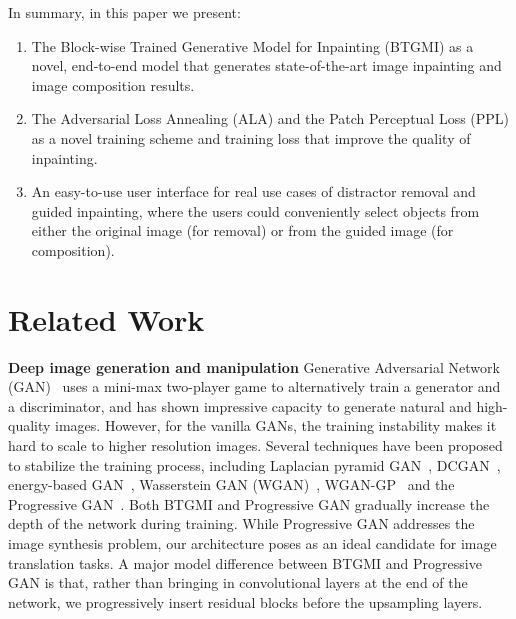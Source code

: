 \documentclass[runningheads]{llncs}
\begin{document}
In summary, in this paper we present:
\begin{enumerate}
\item The Block-wise Trained Generative Model for Inpainting (BTGMI) as a novel, end-to-end model that generates state-of-the-art image inpainting and image composition results.  
\item The Adversarial Loss Annealing (ALA) and the Patch Perceptual Loss (PPL) as a novel training scheme and training loss that improve the quality of inpainting. 
\item An easy-to-use user interface for real use cases of distractor removal and guided inpainting, where the users could conveniently select objects from either the original image (for removal) or from the guided image (for composition).
\end{enumerate}


\section{Related Work}

\noindent\textbf{Deep image generation and manipulation} Generative Adversarial Network (GAN)~\cite{goodfellow2014generative} uses a mini-max two-player game to alternatively train a generator and a discriminator, and has shown impressive capacity to generate natural and high-quality images. However, for the vanilla GANs, the training instability makes it hard to scale to higher resolution images. Several techniques have been proposed to stabilize the training process, including Laplacian pyramid GAN~\cite{denton2015deep}, DCGAN~\cite{radford2015unsupervised}, energy-based GAN~\cite{zhao2016energy}, Wasserstein GAN (WGAN)~\cite{arjovsky2017wasserstein}, WGAN-GP~\cite{gulrajani2017improved} and the Progressive GAN~\cite{karras2017progressive}. Both BTGMI and Progressive GAN gradually increase the depth of the network during training. While Progressive GAN addresses the image synthesis problem, our architecture poses as an ideal candidate for image translation tasks. A major model difference between BTGMI and Progressive GAN is that, rather than bringing in convolutional layers at the end of the network, we progressively insert residual blocks before the upsampling layers. 
\end{document}
